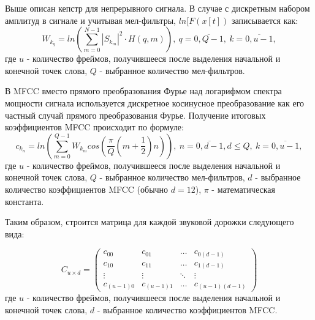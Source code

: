 Выше описан кепстр для непрерывного сигнала. В случае с дискретным набором амплитуд в сигнале и учитывая мел-фильтры, $ln[F(x[t])$ записывается как:
\begin{equation}
	W_{k_q} = ln(\sum_{m=0}^{N-1} |S_{k_m}|^2 \cdot H(q,m)),~q=\overline{0,Q-1},~k=\overline{0,u-1},
\end{equation}
где $u$ - количество фреймов, получившееся после выделения начальной и конечной точек слова, $Q$ - выбранное количество мел-фильтров.

В MFCC вместо прямого преобразования Фурье над логарифмом спектра мощности сигнала используется дискретное косинусное преобразование как его частный случай прямого преобразования Фурье. Получение итоговых коэффициентов MFCC происходит по формуле:
\begin{equation}
	c_{k_n} = ln(\sum_{m=0}^{Q-1} W_{k_m} cos(\dfrac{\pi}{Q} (m+\dfrac{1}{2})n)),~n=\overline{0,d-1},d \le Q,~k=\overline{0,u-1},
\end{equation}
где $u$ - количество фреймов, получившееся после выделения начальной и конечной точек слова, $Q$ - выбранное количество мел-фильтров, $d$ - выбранное количество коэффициентов MFCC (обычно $d=12$), $\pi$ - математическая константа.

Таким образом, строится матрица для каждой звуковой дорожки следующего вида:

\begin{equation*}
	C_{u \times d} = \left(
	\begin{array}{cccc}
		c_{00} & c_{01} & \ldots & c_{0(d-1)}\\
		c_{10} &  c_{11} & \ldots & c_{1(d-1)}\\
		\vdots & \vdots & \ddots & \vdots\\
		c_{(u-1)0} & c_{(u-1)1} & \ldots & c_{(u-1)(d-1)}
	\end{array}
	\right)
\end{equation*}
где $u$ - количество фреймов, получившееся после выделения начальной и конечной точек слова, $d$ - выбранное количество коэффициентов MFCC.

\label{par:unify_coeffs}
